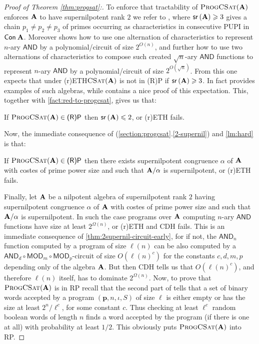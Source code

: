\documentclass[11pt,a4paper]{amsart}
\newcounter{senumi}[section]
\newcounter{senumip}[section]
\newcounter{temp}[section]
\def\thesenumi{\thesection.\arabic{senumip}}
\newenvironment{senumerate}{\begin{list}{\hspace{-2em}(\thesenumi)}{\usecounter{senumip}}
\setcounter{senumip}{\value{temp}}
    }{\setcounter{temp}{\value{senumip}}
     \end{list}}
\newcommand{\rptime}{\textsf{RP}\xspace}
\newcommand{\prptime}{\textsf{(R)P}\xspace}
\newcommand{\m}[1]{{\uppercase {\bf{#1}}}}
\renewcommand{\leq}{\leqslant}
\renewcommand{\geq}{\geqslant}
\newcommand{\con}[1]{{\sf Con\:\m{#1}}}
\newcommand{\po}[1]{{\mathbf {#1}}}
\newcommand{\gProblem}[2]{\ensuremath{\operatorname{\textup{\textsc{{#2}}}}
		\ifthenelse{\equal{#1}{}}{}{\!\left( {#1} \right)}}}
\newcommand{\csat}[1]{\gProblem{#1}{CSat}}
\newcommand{\progcsat}[1]{\gProblem{#1}{ProgCSat}}
\newcommand{\pupi}{PUPI }
\newcommand{\sr}[1]{{\mathsf{sr}\left(#1\right)}}
\newcommand{\progg}[4]{\left(#1,#2,#3,#4\right)}
\newcommand{\ccand}{\mathsf{AND}}
\newcommand{\ccmod}{\mathsf{MOD}}
\newcommand{\cdhh}{CDH\xspace}
\newcommand{\prethh}{(r)ETH\xspace}
\begin{document}
\begin{proof}[Proof of Theorem \ref{thm:progsat}:]
\noindent
To enforce that tractability of $\progcsat{\m A}$ enforces $\m A$ to have supernilpotent rank $2$
we refer to \cite{IdziakKK20}, where $\sr{\m A}\geq 3$ gives a chain $p_1\neq p_2\neq p_3$
of primes occurring as characteristics in consecutive \pupi in $\con{\m A}$.
Moreover \cite{IdziakKK20} shows how to use one alternation of characteristics
to represent $n$-ary $\ccand$ by a polynomial/circuit of size $2^{O(n)}$,
and further how to use two alternations of characteristics
to compose such created $\sqrt{n}$-ary $\ccand$ functions
to represent $n$-ary $\ccand$ by a polynomial/circuit of size $2^{O(\sqrt{n})}$.
From this one expects that under \prethh $\csat{\m A}$ is not in \prptime if $\sr{\m a}\geq 3$.
In fact \cite{IdziakKK20} provides examples of such algebras,
while \cite{Kompatscher21} contains a nice proof of this expectation. This, together with \cref{fact:red-to-progcsat}, gives us that:





\begin{senumerate}
\item
\label{2-supernil}
If $\progcsat{\m A}\in \prptime$ then $\sr{\m A}\leq 2$, or \prethh fails.
\end{senumerate}
Now, the immediate consequence of (\ref{section:progcsat}.\ref{2-supernil}) and \cref{lm:hard} is that:

\begin{senumerate}
\item
\label{2-supernil-and-one-prime}
If $\progcsat{\m A}\in \prptime$ then there exists supernilpotent congruence $\alpha$ of $\m A$ with costes of prime power size and such that $\m A/\alpha$ is supernilpotent, or \prethh fails.
\end{senumerate}

Finally, let $\m A$ be a nilpotent algebra of supernilpotent rank $2$ having supernilpotent congruence $\alpha$ of $\m A$ with costes of prime power size and such that $\m A/\alpha$ is supernilpotent. In such the case  programs over $\m A$ computing $n$-ary $\ccand$ functions have size at least $2^{\Omega(n)}$, or \prethh and \cdhh fails.
This is an immediate consequence of \cref{thm:2supernil-circuit-early},
for if not, the $\ccand_n$ function computed by a program of size $\ell(n)$
can be also computed by a $\ccand_d\circ\ccmod_m\circ\ccmod_p$-circuit of size $O(\ell(n)^c)$
for the constants $c,d,m,p$ depending only of the algebra $\m A$.
But then CDH tells us that $O(\ell(n)^c)$, and therefore $\ell(n)$ itself,
has to dominate $2^{\Omega(n)}$.
Now, to prove that $\progcsat{\m A}$ is in \rptime recall that the second part of \cite[Proposition 9]{IdziakKKW22-icalp} tells
that a set of binary words accepted by a program $\progg{\po p}{n}{\iota}{S}$ of size $\ell$ is either empty
or has the size at least $2^n/\ell^{c}$, for some constant $c$. 
Thus checking at least $\ell^{c}$ random boolean words of length $n$ finds a word accepted by the program (if there is one at all)
with probability at least $1/2$.
This obviously puts $\progcsat{\m A}$ into \rptime.
\end{proof}
\end{document}
